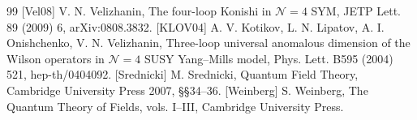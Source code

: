 \begin{thebibliography}{99}
 [Vel08] V. N. Velizhanin, The four-loop Konishi in $\mathcal N=4$ SYM, JETP Lett. 89 (2009) 6, arXiv:0808.3832.
 [KLOV04] A. V. Kotikov, L. N. Lipatov, A. I. Onishchenko, V. N. Velizhanin, Three-loop universal anomalous dimension of the Wilson operators in $\mathcal N=4$ SUSY Yang--Mills model, Phys. Lett. B595 (2004) 521, hep-th/0404092.
 [Srednicki] M. Srednicki, Quantum Field Theory, Cambridge University Press 2007, \S\S34--36.
 [Weinberg] S. Weinberg, The Quantum Theory of Fields, vols. I--III, Cambridge University Press.
\end{thebibliography}



